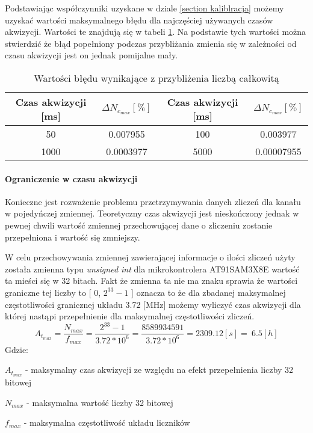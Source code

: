 Podstawiając współczynniki uzyskane w dziale \ref{section kaliblracja} możemy uzyskać wartości maksymalnego błędu dla najczęściej używanych czasów akwizycji. Wartości te znajdują się w tabeli \ref{tab przyblizenie niep}. Na podstawie tych wartości można stwierdzić że błąd popełniony podczas przybliżania zmienia się w zależności od czasu akwizycji jest on jednak pomijalne mały.

\begin{table}
        \centering
        \caption{Wartości błędu wynikające z przybliżenia liczbą całkowitą}
        \label{tab przyblizenie niep}
        \begin{tabular}{|c|c||c|c|}
                \hline
                Czas akwizycji [ms] &   $\Delta N_{c_{max}} [\%]$&Czas akwizycji [ms] &   $\Delta N_{c_{max}} [\%]$ \\ \hline
                50 & 0.007955 & 100 & 0.003977 \\ \hline
                1000 & 0.0003977 & 5000 & 0.00007955 \\ \hline
        \end{tabular}
\end{table}

\paragraph{Ograniczenie w czasu akwizycji}

Konieczne jest rozważenie problemu przetrzymywania danych zliczeń dla kanału w pojedyńczej zmiennej. Teoretyczny czas akwizycji jest nieskończony jednak w pewnej chwili wartość zmiennej przechowującej dane o zliczeniu zostanie przepełniona i wartość się zmniejszy.

W celu przechowywania zmiennej zawierającej informacje o ilości zliczeń użyty została zmienna typu \textit{unsigned int} dla mikrokontrolera AT91SAM3X8E wartość ta mieści się w 32 bitach. Fakt że zmienna ta nie ma znaku sprawia że wartości graniczne tej liczby to [ 0, $2^{33}-1$ ] oznacza to że dla zbadanej maksymalnej częstotliwości granicznej układu 3.72 [MHz] możemy wyliczyć czas akwizycji dla której nastąpi przepełnienie dla maksymalnej częstotliwości zliczeń. 
\begin{equation}
        A_{t_{max}} = \frac{N_{max}}{f_{max}} = \frac{2^{33}-1}{3.72 * 10^{6}} = \frac{8589934591}{3.72 * 10^{6}} = 2309.12 [s] = ~6.5 [h]
\end{equation}
Gdzie:
\begin{description}
        \item $A_{t_{max}}$ - maksymalny czas akwizycji ze względu na efekt przepełnienia liczby 32 bitowej
        \item $N_{max}$ - maksymalna wartość liczby 32 bitowej
        \item $f_{max}$ - maksymalna częstotliwość układu liczników
\end{description}

